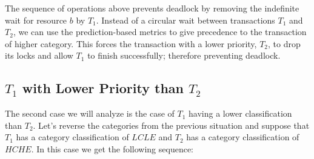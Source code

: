 \documentclass[conference]{IEEEtran}
\begin{document}
The sequence of operations above prevents deadlock by removing the indefinite wait for resource $b$ by $T_{1}$. Instead of a circular wait between transactions $T_{1}$ and $T_{2}$, we can use the prediction-based metrics to give precedence to the transaction of higher category. This forces the transaction with a lower priority, $T_{2}$, to drop its locks and allow $T_{1}$ to finish successfully; therefore preventing deadlock.

\subsection{$T_{1}$ with Lower Priority than $T_{2}$}
\label{sec:t1_lower_than_t2}
The second case we will analyze is the case of $T_{1}$ having a lower classification than $T_{2}$. Let's reverse the categories from the previous situation and suppose that $T_{1}$ has a category classification of $LCLE$ and $T_{2}$ has a category classification of $HCHE$. In this case we get the following sequence:
\end{document}
